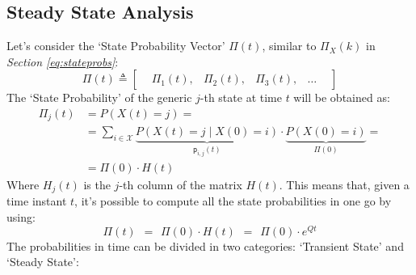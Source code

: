 \documentclass[12pt,a4paper]{article}
\newcommand*{\transp}{\mathsf{p}}
\begin{document}
\subsection{Steady State Analysis}
Let's consider the `State Probability Vector' $\Pi(t)$, similar to $\Pi_X(k)$ in \emph{Section \ref{eq:stateprobs}}:
$$
\Pi(t)\triangleq \left[
\begin{matrix}
&\Pi_1(t),& \Pi_2(t),& \Pi_3(t),& \dots&
\end{matrix}
\right]
$$ 
The `State Probability' of the generic $j$-th state at time $t$ will be obtained as:
\begin{equation*}
\begin{aligned}
\Pi_j(t) & = P(X(t) = j) = \\
& = \sum_{i\in\mathcal{X}}\underbrace{P(X(t)=j \mid X(0) = i)}_{\transp_{i,j}(t)} \cdot \underbrace{P(X(0) = i)}_{\Pi(0)} = \\
& = \Pi(0) \cdot H(t)
\end{aligned}
\end{equation*}
Where $H_j(t)$ is the $j$-th column of the matrix $H(t)$. This means that, given a time instant $t$, it's possible to compute all the state probabilities in one go by using:
$$
\Pi(t)\hspace{5pt}=\hspace{5pt}
\Pi(0)\cdot H(t)\hspace{5pt}=\hspace{5pt}
\Pi(0)\cdot e^{Qt}
$$
The probabilities in time can be divided in two categories: `Transient State' and `Steady State':
\end{document}
